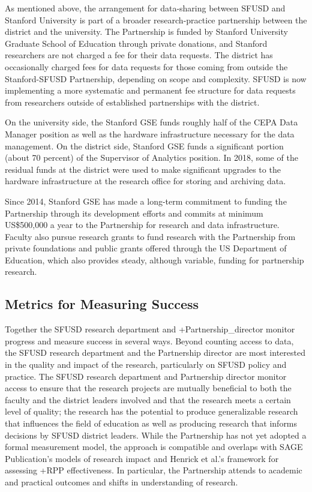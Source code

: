 \documentclass[
]{book}
\begin{document}
As mentioned above, the arrangement for data-sharing between SFUSD and Stanford University is part of a broader research-practice partnership between the district and the university. The Partnership is funded by Stanford University Graduate School of Education through private donations, and Stanford researchers are not charged a fee for their data requests. The district has occasionally charged fees for data requests for those coming from outside the Stanford-SFUSD Partnership, depending on scope and complexity. SFUSD is now implementing a more systematic and permanent fee structure for data requests from researchers outside of established partnerships with the district.

On the university side, the Stanford GSE funds roughly half of the CEPA Data Manager position as well as the hardware infrastructure necessary for the data management. On the district side, Stanford GSE funds a significant portion (about 70 percent) of the Supervisor of Analytics position. In 2018, some of the residual funds at the district were used to make significant upgrades to the hardware infrastructure at the research office for storing and archiving data.

Since 2014, Stanford GSE has made a long-term commitment to funding the Partnership through its development efforts and commits at minimum US\$500,000 a year to the Partnership for research and data infrastructure. Faculty also pursue research grants to fund research with the Partnership from private foundations and public grants offered through the US Department of Education, which also provides steady, although variable, funding for partnership research.

\hypertarget{metrics-for-measuring-success}{%
\subsection{Metrics for Measuring Success}\label{metrics-for-measuring-success}}

Together the SFUSD research department and +Partnership\_director\textbar{} monitor progress and measure success in several ways. Beyond counting access to data, the SFUSD research department and the Partnership director are most interested in the quality and impact of the research, particularly on SFUSD policy and practice. The SFUSD research department and Partnership director monitor access to ensure that the research projects are mutually beneficial to both the faculty and the district leaders involved and that the research meets a certain level of quality; the research has the potential to produce generalizable research that influences the field of education as well as producing research that informs decisions by SFUSD district leaders. While the Partnership has not yet adopted a formal measurement model, the approach is compatible and overlaps with SAGE Publication's \citeyearpar{sagepublishing2019} models of research impact and Henrick et al.'s \citeyearpar{henrick2017} framework for assessing +RPP\textbar{} effectiveness. In particular, the Partnership attends to academic and practical outcomes and shifts in understanding of research.
\end{document}
